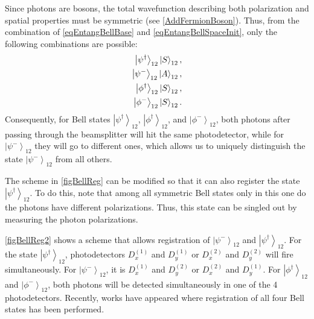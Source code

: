 Since photons are bosons, 
the total wavefunction
describing both polarization and spatial properties
must be symmetric \cite{bFeinman}
(see \autoref{AddFermionBoson}). Thus, from the combination of 
\eqref{eqEntangBellBase} and \eqref{eqEntangBellSpaceInit}, only the
following combinations are possible:
\begin{eqnarray}
\left|\psi^{\dag}\right>_{12}\ket{S}_{12},
\nonumber \\ 
\left|\psi^{-}\right>_{12}\ket{A}_{12}, 
\nonumber \\ 
\left|\phi^{\dag}\right>_{12}\ket{S}_{12}, 
\nonumber \\ 
\left|\phi^{-}\right>_{12}\ket{S}_{12}.
\nonumber
\end{eqnarray}
Consequently, for Bell states 
$\left|\psi^{\dag}\right>_{12}$, $\left|\phi^{\dag}\right>_{12}$, and
$\left|\phi^{-}\right>_{12}$, both photons after passing through
the beamsplitter will hit the same photodetector, while for
$\left|\psi^{-}\right>_{12}$ they will go to different ones, which
allows us to uniquely distinguish the state $\left|\psi^{-}\right>_{12}$
from all others. 



The scheme in \autoref{figBellReg} can be modified so that it
can also register the state
$\left|\psi^{\dag}\right>_{12}$. To do this, note that among all
symmetric Bell states only in this one do the photons have different
polarizations. Thus, this state can be singled out by measuring the photon polarizations.

\autoref{figBellReg2} shows a scheme that allows
registration of $\left|\psi^{-}\right>_{12}$ and
$\left|\psi^{\dag}\right>_{12}$. For the state
$\left|\psi^{\dag}\right>_{12}$, photodetectors 
$D^{(1)}_x$ and $D^{(1)}_y$ or $D^{(2)}_x$ and $D^{(2)}_y$ will fire simultaneously.
For $\left|\psi^{-}\right>_{12}$, it is $D^{(1)}_x$ and $D^{(2)}_y$ or
$D^{(2)}_x$ and $D^{(1)}_y$. For $\left|\phi^{\dag}\right>_{12}$ and
$\left|\phi^{-}\right>_{12}$, both photons will be detected
simultaneously in one of the 4 photodetectors. Recently,
works have appeared \cite{bKulik} where registration of
all four Bell states has been performed.